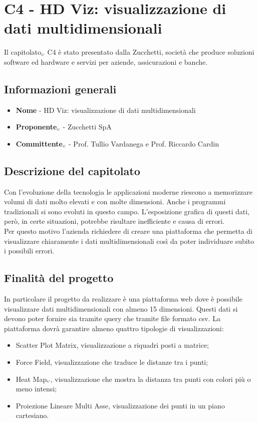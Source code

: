 \chapter{C4 - HD Viz: visualizzazione di dati multidimensionali} \label{CapitolatoC4}
Il capitolato$_{\scaleto{G}{3pt}}$ C4 è stato presentato dalla Zucchetti, società che produce soluzioni software ed hardware e servizi per aziende, assicurazioni e banche.
\section{Informazioni generali} \label{C4InformazioniGenerali}
\begin{itemize}
	\item \textbf{Nome} - HD Viz: visualizzazione di dati multidimensionali
	\item \textbf{Proponente}$_{\scaleto{G}{3pt}}$ - Zucchetti SpA
	\item \textbf{Committente}$_{\scaleto{G}{3pt}}$ - Prof. Tullio Vardanega e Prof. Riccardo Cardin
\end{itemize}
\section{Descrizione del capitolato} \label{C4DescrizioneDelCapitolato}
Con l'evoluzione della tecnologia le applicazioni moderne riescono a memorizzare volumi di dati molto elevati e con molte dimensioni. Anche i programmi tradizionali si sono evoluti in questo campo. L'esposizione grafica di questi dati, però, in certe situazioni, potrebbe risultare inefficiente e causa di errori. \\
Per questo motivo l'azienda richiedere di creare una piattaforma che permetta di visualizzare chiaramente i dati multidimensionali così da poter individuare subito i possibili errori.
\section{Finalità del progetto} \label{C4FinalitàDelProgetto}
In particolare il progetto da realizzare è una piattaforma web dove è possibile visualizzare dati multidimensionali con almeno 15 dimensioni. Questi dati si devono poter fornire sia tramite query che tramite file formato csv. La piattaforma dovrà garantire almeno quattro tipologie di visualizzazioni:
\begin{itemize}
	\item Scatter Plot Matrix, visualizzazione a riquadri posti a matrice;
	\item Force Field, visualizzazione che traduce le distanze tra i punti;
	\item Heat Map$_{\scaleto{G}{3pt}}$, visualizzazione che mostra la distanza tra punti con colori più o meno intensi;
	\item Proiezione Lineare Multi Asse, visualizzazione dei punti in un piano cartesiano.
\end{itemize}
